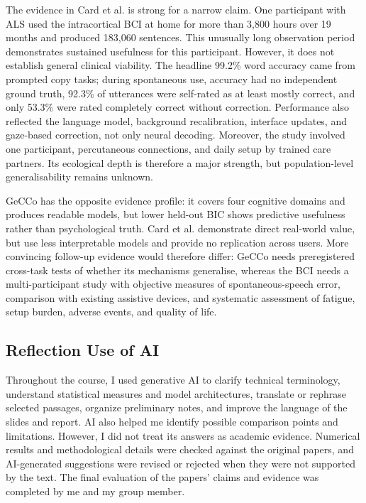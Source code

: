 The evidence in Card et al. is strong for a narrow claim. One participant with ALS used the intracortical BCI at home for more than 3,800 hours over 19 months and produced 183,060 sentences. This unusually long observation period demonstrates sustained usefulness for this participant. However, it does not establish general clinical viability. The headline 99.2\% word accuracy came from prompted copy tasks; during spontaneous use, accuracy had no independent ground truth, 92.3\% of utterances were self-rated as at least mostly correct, and only 53.3\% were rated completely correct without correction. Performance also reflected the language model, background recalibration, interface updates, and gaze-based correction, not only neural decoding. Moreover, the study involved one participant, percutaneous connections, and daily setup by trained care partners. Its ecological depth is therefore a major strength, but population-level generalisability remains unknown.

GeCCo has the opposite evidence profile: it covers four cognitive domains and produces readable models, but lower held-out BIC shows predictive usefulness rather than psychological truth. Card et al. demonstrate direct real-world value, but use less interpretable models and provide no replication across users. More convincing follow-up evidence would therefore differ: GeCCo needs preregistered cross-task tests of whether its mechanisms generalise, whereas the BCI needs a multi-participant study with objective measures of spontaneous-speech error, comparison with existing assistive devices, and systematic assessment of fatigue, setup burden, adverse events, and quality of life.
\subsection{Reflection Use of AI}
Throughout the course, I used generative AI to clarify technical terminology, understand statistical measures and model architectures, translate or rephrase selected passages, organize preliminary notes, and improve the language of the slides and report. AI also helped me identify possible comparison points and limitations. However, I did not treat its answers as academic evidence. Numerical results and methodological details were checked against the original papers, and AI-generated suggestions were revised or rejected when they were not supported by the text. The final evaluation of the papers' claims and evidence was completed by me and my group member.

